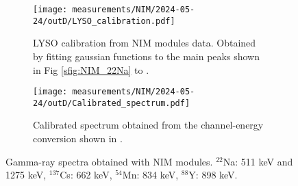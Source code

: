 \begin{figure}[H]
  \begin{subfigure}[t]{\textwidth}
    \centering
    \texttt{[image: measurements/NIM/2024-05-24/outD/LYSO\_calibration.pdf]}
    \caption{\label{sfig:NIM_LYSO_calibration}LYSO calibration from NIM modules data. Obtained by fitting gaussian functions to the main peaks shown in Fig \ref{sfig:NIM_22Na} to .}
  \end{subfigure}
  \medskip
  \begin{subfigure}[t]{\textwidth}
    \centering
    \texttt{[image: measurements/NIM/2024-05-24/outD/Calibrated\_spectrum.pdf]}
    \caption{\label{sfig:NIM_LYSO_calibrated_spectrum}Calibrated spectrum obtained from the channel-energy conversion shown in .}
  \end{subfigure}
  \caption{\label{fig:NIM_calibration}Gamma-ray spectra obtained with NIM modules. $^{22}$Na: 511 keV and 1275 keV, $^{137}$Cs: 662 keV, $^{54}$Mn: 834 keV, $^{88}$Y: 898 keV.}
\end{figure}